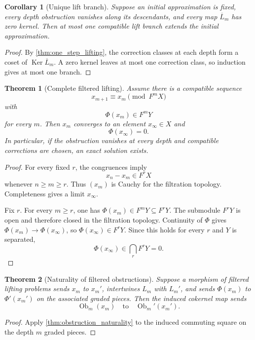 \documentclass[11pt,a4paper]{article}
\newtheorem{theorem}{Theorem}[section]
\theoremstyle{plain}
\newtheorem{corollary}[corollary]{Corollary}
\theoremstyle{definition}
\theoremstyle{remark}
\newcommand{\Ob}{\operatorname{Ob}}
\newcommand{\Ker}{\operatorname{Ker}}
\begin{document}
\begin{corollary}[Unique lift branch]\label{cor:unique_lift_branch}
Suppose an initial approximation is fixed, every depth obstruction vanishes along its descendants, and every map $\overline L_m$ has zero kernel.  Then at most one compatible lift branch extends the initial approximation.
\end{corollary}

\begin{proof}
By \cref{thm:one_step_lifting}, the correction classes at each depth form a coset of $\Ker\overline L_m$.  A zero kernel leaves at most one correction class, so induction gives at most one branch.
\end{proof}

\begin{theorem}[Complete filtered lifting]\label{thm:complete_filtered_lifting}
Assume there is a compatible sequence
\[
x_{m+1}\equiv x_m\pmod{F^mX}
\]
with
\[
\Phi(x_m)\in F^mY
\]
for every $m$.  Then $x_m$ converges to an element $x_\infty\in X$ and
\[
\Phi(x_\infty)=0.
\]
In particular, if the obstruction vanishes at every depth and compatible corrections are chosen, an exact solution exists.
\end{theorem}

\begin{proof}
For every fixed $r$, the congruences imply
\[
x_n-x_m\in F^rX
\]
whenever $n\ge m\ge r$.  Thus $(x_m)$ is Cauchy for the filtration topology.  Completeness gives a limit $x_\infty$.

Fix $r$.  For every $m\ge r$, one has $\Phi(x_m)\in F^mY\subseteq F^rY$.  The submodule $F^rY$ is open and therefore closed in the filtration topology.  Continuity of $\Phi$ gives $\Phi(x_m)\to\Phi(x_\infty)$, so $\Phi(x_\infty)\in F^rY$.  Since this holds for every $r$ and $Y$ is separated,
\[
\Phi(x_\infty)\in\bigcap_rF^rY=0.
\]
\end{proof}

\begin{theorem}[Naturality of filtered obstructions]\label{thm:filtered_obstruction_naturality}
Suppose a morphism of filtered lifting problems sends $x_m$ to $x_m'$, intertwines $L_m$ with $L_m'$, and sends $\Phi(x_m)$ to $\Phi'(x_m')$ on the associated graded pieces.  Then the induced cokernel map sends
\[
\Ob_m(x_m)
\quad\text{to}\quad
\Ob_m'(x_m').
\]
\end{theorem}

\begin{proof}
Apply \cref{thm:obstruction_naturality} to the induced commuting square on the depth $m$ graded pieces.
\end{proof}
\end{document}
